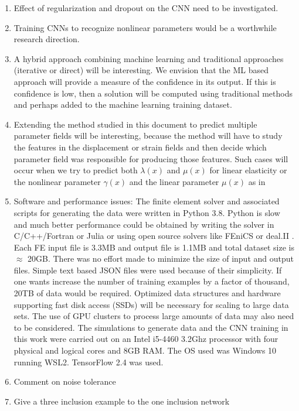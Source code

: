 \documentclass[12pt]{article}
\begin{document}
\begin{enumerate}
\item{Effect of regularization and dropout on the CNN need to be investigated.}
\item{Training CNNs to recognize nonlinear parameters would be a worthwhile research direction.}
\item{A hybrid approach combining machine learning and traditional approaches (iterative or direct) will be interesting. We envision that the ML based approach will provide a measure of the confidence in its output. If this is confidence is low, then a solution will be computed using traditional methods and perhaps added to the machine learning training dataset.}
\item{Extending the method studied in this document to predict multiple parameter fields will be interesting, because the method will have to study the features in the displacement or strain fields and then decide which parameter field was responsible for producing those features. Such cases will occur when we try to predict both $\lambda(x)$ and $\mu(x)$ for linear elasticity or the nonlinear parameter $\gamma(x)$ and the linear parameter $\mu(x)$ as in \cite{paper:gokhale2008}}
\item{Software and performance issues: The finite element solver and associated scripts for generating the data were written in Python 3.8. Python is slow and much better performance could be obtained by writing the solver in C/C++/Fortran or Julia or using open source solvers like FEniCS \cite{paper:fenics} or deal.II \cite{misc:deal.ii}. Each FE input file is 3.3MB and output file is 1.1MB and total dataset size is $\approx$  20GB. There was no effort made to minimize the size of input and output files. Simple text based JSON files were used because of their simplicity. If one wants increase the number of training examples by a factor of thousand, 20TB of data would be required. Optimized data structures and hardware supporting fast disk access (SSDs) will be necessary for scaling to large data sets. The use of GPU clusters to process large amounts of data may also need to be considered. The simulations to generate data and the CNN training in this work were carried out on an Intel i5-4460 3.2Ghz processor with four physical and logical cores and 8GB RAM. The OS used was Windows 10 running WSL2. TensorFlow 2.4 was used.}
\item{Comment on noise tolerance}
\item{Give a three inclusion example to the one inclusion network}
\end{enumerate}
\clearpage
{}

\end{document}
